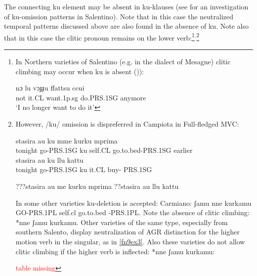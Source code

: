 \documentclass[output=paper]{langscibook}
\begin{document}
The connecting ku element may be absent in ku-klauses (see \cite{ledgeway2015a} for an investigation of ku-omission patterns in Salentino).  Note that in this case the neutralized temporal patterns discussed above are also found in the absence of ku. Note also that in this case the clitic pronoun remains on the lower verb:\footnote{In Northern varieties of Salentino (e.g. in the dialect of Mesagne) clitic climbing may occur when ku is absent (\cite{calabrese1993a, terzi1992a, terzi1994a, terzi1996a})):

\ea \label{fn8ex}\gll nɔ  lu  vɔɟɟu  ffattsu   ccui    \\ 
 not it.CL  want.1p.sg  do.PRS.1SG  anymore\\
 \glt `I no longer want to do it’
\z 

}$^,$\footnote{However, /ku/ omission is dispreferred in Campiota in Full-fledged MVC:

\ea \label{fn9ex}
    \ea \label{fn9exa} \gll stasira au      ku  mme    kurku       mprima\\
     tonight go-PRS.1SG  ku self.CL  go.to.bed-PRS.1SG  earlier\\
    \ex \label{fn9exb}\gll stasira  au       ku  llu   kattu\\
   tonight  go-PRS.1SG  ku  it.CL buy- PRS.1SG \\
    \z
\z

\ea \label{fn9ex2}
    \ea \label{fn9ex2a}???stasira au me kurku mprima
    \ex \label{fn9ex2b}??stasira au llu kattu 
    \z
\z
  
In some other varieties ku-deletion is accepted:  Carmiano: ʃamu nne kurkamu GO-PRS.1PL self.cl   go.to.bed -PRS.1PL. Note the absence of clitic climbing:  *nne ʃamu kurkamu.  Other varieties of the same type, especially from southern Salento, display neutralization of AGR distinction for the higher motion verb in the singular, as in \ref{fn9ex3}.  Also these varieties do not allow clitic climbing if the higher verb is inflected: *nne ʃamu kurkamu:  

\textcolor{red}{table missing}}

\begin{comment}

\ea \label{fn9ex3}
\begin{table}[htb] \small
\begin{tabular}{llll}
bba        & mme     & korku             & ( Tricase) \\
GO-PRS.1SG & self.cl & go.to.bed-PRS.1SG &            \\
bba        & tte     & korki             & 2SG        \\
bba        & sse     & korka             & 3SG        \\
ʃamu       & nne     & korkamu           & 1PL        \\
ʃati       & bbe     & korkati           & 2PL        \\
ane        & sse     & korkane           & 3PL       
\end{tabular}
\end{table}
\z

\end{comment}
\end{document}
